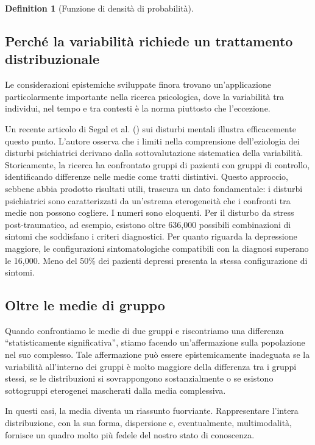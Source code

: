 \documentclass[
  letterpaper,
  DIV=11,
  numbers=noendperiod,
  oneside]{scrreprt}
\theoremstyle{definition}
\theoremstyle{plain}
\theoremstyle{definition}
\newtheorem{definition}{Definition}[chapter]
\theoremstyle{remark}
\begin{document}
\begin{definition}[Funzione di densità di
probabilità]
\subsection{Perché la variabilità richiede un trattamento
distribuzionale}\label{perchuxe9-la-variabilituxe0-richiede-un-trattamento-distribuzionale}

Le considerazioni epistemiche sviluppate finora trovano un'applicazione
particolarmente importante nella ricerca psicologica, dove la
variabilità tra individui, nel tempo e tra contesti è la norma piuttosto
che l'eccezione.

Un recente articolo di Segal et al.
() sui disturbi mentali illustra
efficacemente questo punto. L'autore osserva che i limiti nella
comprensione dell'eziologia dei disturbi psichiatrici derivano dalla
sottovalutazione sistematica della variabilità. Storicamente, la ricerca
ha confrontato gruppi di pazienti con gruppi di controllo, identificando
differenze nelle medie come tratti distintivi. Questo approccio, sebbene
abbia prodotto risultati utili, trascura un dato fondamentale: i
disturbi psichiatrici sono caratterizzati da un'estrema eterogeneità che
i confronti tra medie non possono cogliere. I numeri sono eloquenti. Per
il disturbo da stress post-traumatico, ad esempio, esistono oltre
636,000 possibili combinazioni di sintomi che soddisfano i criteri
diagnostici. Per quanto riguarda la depressione maggiore, le
configurazioni sintomatologiche compatibili con la diagnosi superano le
16,000. Meno del 50\% dei pazienti depressi presenta la stessa
configurazione di sintomi.

\subsection{Oltre le medie di gruppo}\label{oltre-le-medie-di-gruppo}

Quando confrontiamo le medie di due gruppi e riscontriamo una differenza
``statisticamente significativa'', stiamo facendo un'affermazione sulla
popolazione nel suo complesso. Tale affermazione può essere
epistemicamente inadeguata se la variabilità all'interno dei gruppi è
molto maggiore della differenza tra i gruppi stessi, se le distribuzioni
si sovrappongono sostanzialmente o se esistono sottogruppi eterogenei
mascherati dalla media complessiva.

In questi casi, la media diventa un riassunto fuorviante. Rappresentare
l'intera distribuzione, con la sua forma, dispersione e, eventualmente,
multimodalità, fornisce un quadro molto più fedele del nostro stato di
conoscenza.


\end{definition}
\end{document}
